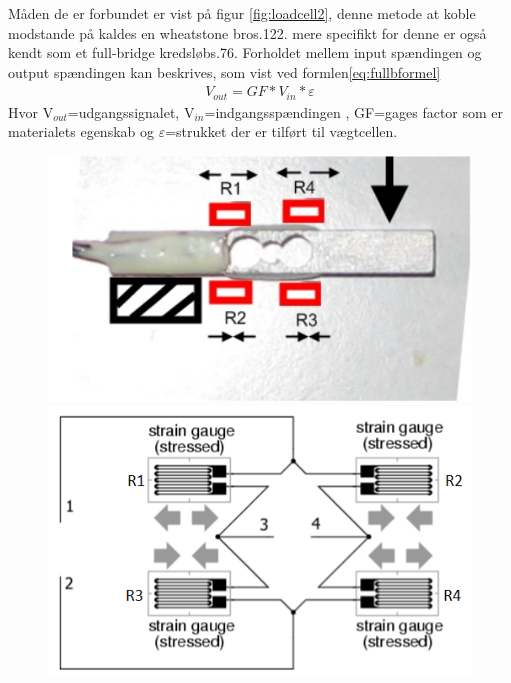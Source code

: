  Måden de er forbundet er vist på figur \ref{fig:loadcell2}, denne metode at koble modstande på kaldes en wheatstone bro\citep{ELengbog}{s.122}. mere specifikt for denne er også kendt som et full-bridge kredsløb\citep{AETbog}{s.76}. Forholdet mellem input spændingen og output spændingen kan beskrives, som vist ved formlen\ref{eq:fullbformel}
\begin{align}
 V_{out}=GF*V_{in}*\varepsilon
 \label{eq:fullbformel}
 \end{align}
 Hvor V$_{out}$=udgangssignalet, V$_{in}$=indgangsspændingen , GF=gages factor som er materialets egenskab og $\varepsilon$=strukket der er tilført til vægtcellen.

\begin{figure}[htbp] \centering
\begin{minipage}[b]{0.48\textwidth} \centering
\includegraphics[width=1.00\textwidth]{billeder/Hardware/loadcell1.PNG} %
\end{minipage} \hfill
\begin{minipage}[b]{0.48\textwidth} \centering
\includegraphics[width=1.00\textwidth]{billeder/Hardware/straingages2.PNG} %

\end{minipage}
\end{figure}
